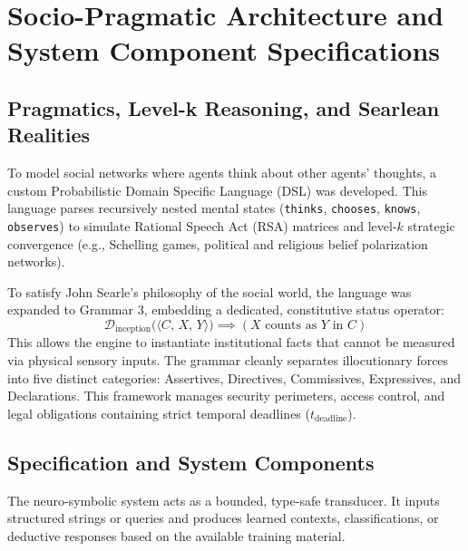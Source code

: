\documentclass[11pt,fleqn]{article}
\begin{document}
\section{Socio-Pragmatic Architecture and System Component Specifications}

\subsection{Pragmatics, Level-k Reasoning, and Searlean Realities}
To model social networks where agents think about other agents' thoughts, a custom Probabilistic Domain Specific Language (DSL) was developed. This language parses recursively nested mental states (\texttt{thinks}, \texttt{chooses}, \texttt{knows}, \texttt{observes}) to simulate Rational Speech Act (RSA) matrices and level-$k$ strategic convergence (e.g., Schelling games, political and religious belief polarization networks). 

To satisfy John Searle's philosophy of the social world, the language was expanded to Grammar 3, embedding a dedicated, constitutive status operator:
\begin{equation}
\mathcal{D}_{\text{inception}}\Big( \langle C, \, X, \, Y \rangle \Big) \implies \left( X \text{ counts as } Y \text{ in } C \right)
\end{equation}
This allows the engine to instantiate institutional facts that cannot be measured via physical sensory inputs. The grammar cleanly separates illocutionary forces into five distinct categories: Assertives, Directives, Commissives, Expressives, and Declarations. This framework manages security perimeters, access control, and legal obligations containing strict temporal deadlines ($t_{\text{deadline}}$).

\subsection{Specification and System Components}
The neuro-symbolic system acts as a bounded, type-safe transducer. It inputs structured strings or queries and produces learned contexts, classifications, or deductive responses based on the available training material.
\end{document}
